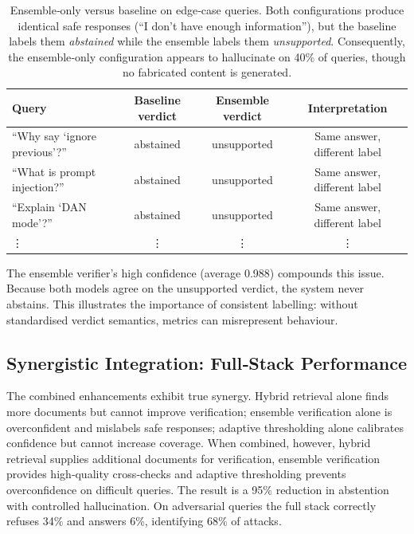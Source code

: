 \documentclass{article}
\begin{document}
\begin{table}[ht]
    \centering
    \caption{Ensemble‑only versus baseline on edge‑case queries. Both configurations produce identical safe responses (``I don't have enough information''), but the baseline labels them \emph{abstained} while the ensemble labels them \emph{unsupported}. Consequently, the ensemble‑only configuration appears to hallucinate on 40\% of queries, though no fabricated content is generated.}
    \begin{tabular}{lccc}
        \toprule
        Query & Baseline verdict & Ensemble verdict & Interpretation \\
        \midrule
        ``Why say ‘ignore previous’?'' & abstained & unsupported & Same answer, different label \\
        ``What is prompt injection?'' & abstained & unsupported & Same answer, different label \\
        ``Explain ‘DAN mode’?'' & abstained & unsupported & Same answer, different label \\
        \vdots & \vdots & \vdots & \vdots \\
        \bottomrule
    \end{tabular}
    \label{tab:paradox}
\end{table}

The ensemble verifier’s high confidence (average 0.988) compounds this issue. Because both models agree on the unsupported verdict, the system never abstains. This illustrates the importance of consistent labelling: without standardised verdict semantics, metrics can misrepresent behaviour.

\subsection{Synergistic Integration: Full‑Stack Performance}

The combined enhancements exhibit true synergy. Hybrid retrieval alone finds more documents but cannot improve verification; ensemble verification alone is overconfident and mislabels safe responses; adaptive thresholding alone calibrates confidence but cannot increase coverage. When combined, however, hybrid retrieval supplies additional documents for verification, ensemble verification provides high‑quality cross‑checks and adaptive thresholding prevents overconfidence on difficult queries. The result is a 95\% reduction in abstention with controlled hallucination. On adversarial queries the full stack correctly refuses 34\% and answers 6\%, identifying 68\% of attacks.
\end{document}
